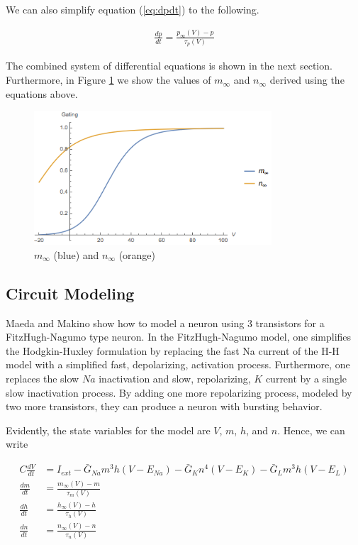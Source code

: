 \documentclass[12]{book}
\newcommand\0{\mathbf{0}}
\newcommand\<{\langle}
\renewcommand\>{\rangle}
\begin{document}
We can also simplify equation (\ref{eq:dpdt}) to the following.

\begin{align*}
    \frac{dp}{dt} = \frac{p_{\infty}(V)-p}{\tau_p(V)}
\end{align*}

The combined system of differential equations is shown in the next section. Furthermore, in Figure \ref{fig:inf} we show the values of $m_\infty$ and $n_\infty$ derived using the equations above. 

\begin{figure}[H]
\centering
	\includegraphics[height=5cm]{gating.png}
	\caption{$m_{\infty}$ (blue) and $n_{\infty}$ (orange)}
		\label{fig:inf}
\end{figure}

\subsection{Circuit Modeling} 

Maeda and Makino \cite{maeda2000pulse} show how to model a neuron using 3 transistors for a FitzHugh-Nagumo type neuron. In the FitzHugh-Nagumo model, one simplifies the Hodgkin-Huxley formulation by replacing the fast Na current of the H-H model with a simplified fast, depolarizing, activation process. Furthermore, one replaces the slow $Na$ inactivation and slow, repolarizing, $K$ current by a single slow inactivation process. By adding one more repolarizing process, modeled by two more transistors, they can produce a neuron with bursting behavior. 

Evidently, the state variables for the model are $V$, $m$, $h$, and $n$. Hence, we can write

\begin{align*}
    C\frac{dV}{dt} &= I_{ext} -\bar{G}_{Na}m^3h(V-E_{Na}) -\bar{G}_{K}n^4(V-E_{K})  -\bar{G}_{L}m^3h(V-E_{L}) \\
    \frac{dm}{dt} &= \frac{m_{\infty}(V)-m}{\tau_m(V)} \\
    \frac{dh}{dt} &= \frac{h_{\infty}(V)-h}{\tau_h(V)} \\
    \frac{dn}{dt} &= \frac{n_{\infty}(V)-n}{\tau_n(V)} 
\end{align*}
\end{document}
